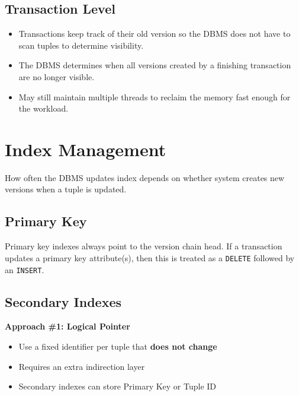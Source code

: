 \documentclass[11pt]{article}
\begin{document}
\subsection*{Transaction Level}
\begin{itemize}
    \item
    Transactions keep track of their old version so the DBMS does not have to scan tuples 
    to determine visibility.
    
    \item
    The DBMS determines when all versions created by a finishing transaction are no 
    longer visible.
    
    \item
    May still maintain multiple threads to reclaim the memory fast enough for the workload.
\end{itemize}

\section{Index Management}
How often the DBMS updates index depends on whether system creates new versions when a 
tuple is updated.

\subsection*{Primary Key}
Primary key indexes always point to the version chain head.
If a transaction updates a primary key attribute(s), then this is treated as a \texttt{DELETE} 
followed by an \texttt{INSERT}.

\subsection*{Secondary Indexes}
        
\textbf{Approach \#1: Logical Pointer}
\begin{itemize}
    \item Use a fixed identifier per tuple that \textbf{does not change}
    \item Requires an extra indirection layer
    \item Secondary indexes can store Primary Key or Tuple ID
\end{itemize}
\end{document}
